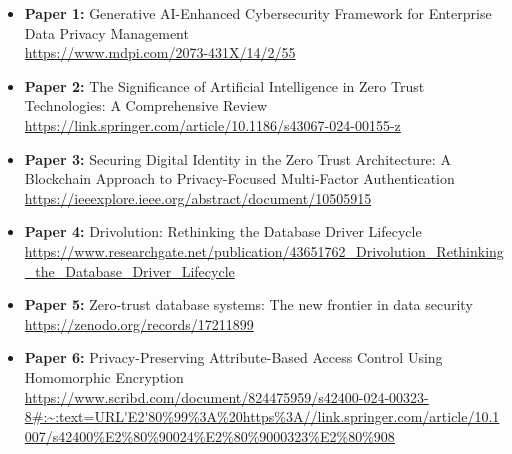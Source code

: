 \begin{itemize}
    \item \textbf{Paper 1:} Generative AI-Enhanced Cybersecurity Framework for Enterprise Data Privacy Management \\
    \url{https://www.mdpi.com/2073-431X/14/2/55}
    
    \item \textbf{Paper 2:} The Significance of Artificial Intelligence in Zero Trust Technologies: A Comprehensive Review \\
    \url{https://link.springer.com/article/10.1186/s43067-024-00155-z}
    
    \item \textbf{Paper 3:} Securing Digital Identity in the Zero Trust Architecture: A Blockchain Approach to Privacy-Focused Multi-Factor Authentication \\
    \url{https://ieeexplore.ieee.org/abstract/document/10505915}

    \item \textbf{Paper 4:} Drivolution: Rethinking the Database Driver Lifecycle \\
    \url{https://www.researchgate.net/publication/43651762_Drivolution_Rethinking_the_Database_Driver_Lifecycle}
    
    \item \textbf{Paper 5:} Zero-trust database systems: The new frontier in data security \\
    \url{https://zenodo.org/records/17211899}
    
    \item \textbf{Paper 6:} Privacy-Preserving Attribute-Based Access Control Using Homomorphic Encryption \\
    \url{https://www.scribd.com/document/824475959/s42400-024-00323-8#:~:text=URL'E2'80%99%3A%20https%3A//link.springer.com/article/10.1007/s42400%E2%80%90024%E2%80%9000323%E2%80%908}
\end{itemize}

